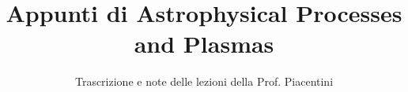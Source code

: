 \documentclass[a4paper,12pt]{article}
\title{Appunti di Astrophysical Processes and Plasmas}
\author{Trascrizione e note delle lezioni della Prof. Piacentini}
\date{}
\begin{document}
\maketitle
\projectintro
\tableofcontents
\newpage

\end{document}
